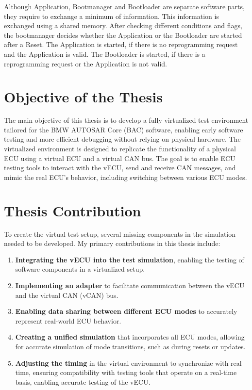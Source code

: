 Although Application, Bootmanager and Bootloader are separate software parts, they require to exchange a minimum of information. This information is exchanged using a shared memory. After checking different conditions and flags, the bootmanager decides whether the Application or the Bootloader are started after a Reset. The Application is started, if there is no reprogramming request and the Application is valid. The Bootloader is started, if there is a reprogramming request or the Application is not valid. \cite{vectorBootloader} 

\section{Objective of the Thesis}
The main objective of this thesis is to develop a fully virtualized test environment tailored for the BMW AUTOSAR Core (BAC) software, enabling early software testing and more efficient debugging without relying on physical hardware. The virtualized environment is designed to replicate the functionality of a physical ECU using a virtual ECU and a virtual CAN bus. The goal is to enable ECU testing tools to interact with the vECU, send and receive CAN messages, and mimic the real ECU's behavior, including switching between various ECU modes.

\section{Thesis Contribution}
To create the virtual test setup, several missing components in the simulation needed to be developed. My primary contributions in this thesis include:
\begin{enumerate}
\item \textbf{Integrating the vECU into the test simulation}, enabling the testing of software components in a virtualized setup.
\item \textbf{Implementing an adapter} to facilitate communication between the vECU and the virtual CAN (vCAN) bus.
\item \textbf{Enabling data sharing between different ECU modes} to accurately represent real-world ECU behavior.
\item \textbf{Creating a unified simulation} that incorporates all ECU modes, allowing for accurate simulation of mode transitions, such as during resets or updates.
\item \textbf{Adjusting the timing} in the virtual environment to synchronize with real time, ensuring compatibility with testing tools that operate on a real-time basis, enabling accurate testing of the vECU.
\end{enumerate}

